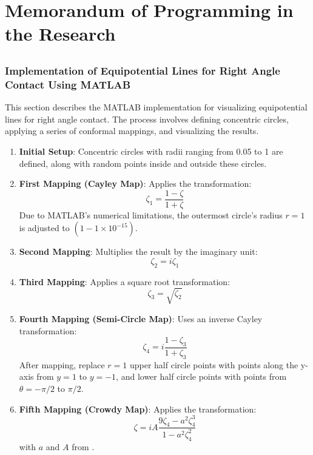 \chapter{Memorandum of Programming in the Research}
\section{}
\subsection{Implementation of Equipotential Lines for Right Angle Contact Using MATLAB}

This section describes the MATLAB implementation for visualizing equipotential lines for right angle contact. The process involves defining concentric circles, applying a series of conformal mappings, and visualizing the results.

\begin{enumerate}
    \item \textbf{Initial Setup}: Concentric circles with radii ranging from 0.05 to 1 are defined, along with random points inside and outside these circles. 
    
    \item \textbf{First Mapping (Cayley Map)}: Applies the transformation:
    \[
    \zeta_1 = \frac{1 - \zeta}{1 + \zeta}
    \]
    Due to MATLAB's numerical limitations, the outermost circle's radius $r=1$ is adjusted to $(1 - 1 \times 10^{-15})$.

    \item \textbf{Second Mapping}: Multiplies the result by the imaginary unit:
    \[
    \zeta_2 = i \zeta_1
    \]

    \item \textbf{Third Mapping}: Applies a square root transformation:
    \[
    \zeta_3 = \sqrt{\zeta_2}
    \]

    \item \textbf{Fourth Mapping (Semi-Circle Map)}: Uses an inverse Cayley transformation:
    \[
    \zeta_4 = i \frac{1 - \zeta_3}{1 + \zeta_3}
    \]
    After mapping, replace \(r=1\) upper half circle points with points along the y-axis from \(y=1\) to \(y=-1\), and lower half circle points with points from \(\theta = -\pi/2\) to \(\pi/2\).

    \item \textbf{Fifth Mapping (Crowdy Map)}: Applies the transformation:
    \[
    \zeta = iA \frac{9\zeta_4 - a^2 \zeta_4^3}{1 - a^2 \zeta_4^2}
    \]
    with $a$ and $A$ from \cite{Crowdy2015}.
\end{enumerate}

